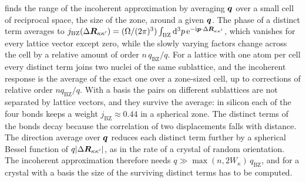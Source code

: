  finds the range of the incoherent approximation by averaging $\bm{q}$ over a small cell of reciprocal space, the size of the zone, around a given $\bm{q}$. The phase of a distinct term averages to $j_{\mathrm{BZ}}(\Delta\bm{R}_{\kappa\kappa'}) = (\Omega/(2\pi)^3)\int_{\mathrm{BZ}}\mathrm{d}^3p\,\mathrm{e}^{-\mathrm{i}\bm{p}\cdot\Delta\bm{R}_{\kappa\kappa'}}$, which vanishes for every lattice vector except zero, while the slowly varying factors change across the cell by a relative amount of order $n\,q_{\mathrm{BZ}}/q$. For a lattice with one atom per cell every distinct term joins two nuclei of the same sublattice, and the incoherent response is the average of the exact one over a zone-sized cell, up to corrections of relative order $nq_{\mathrm{BZ}}/q$. With a basis the pairs on different sublattices are not separated by lattice vectors, and they survive the average: in silicon each of the four bonds keeps a weight $j_{\mathrm{BZ}} \approx 0.44$ in a spherical zone. The distinct terms of the bonds decay because the correlation of two displacements falls with distance. The direction average over $\bm{q}$ reduces each distinct term further by a spherical Bessel function of $q|\Delta\bm{R}_{\kappa\kappa'}|$, as in the rate of a crystal of random orientation. The incoherent approximation therefore needs $q \gg \max(n, 2W_\kappa)\,q_{\mathrm{BZ}}$, and for a crystal with a basis the size of the surviving distinct terms has to be computed.

